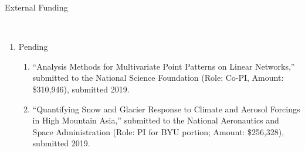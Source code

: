 \documentclass[11pt]{article}
\newcommand{\head}[1]{ %
    \bigskip %
    \begin{large}\begin{bf}{#1}\end{bf}\end{large} %

    \ \\ [-1.3cm] %

    \hrulefill}
\begin{document}
\head{External Funding}
\begin{enumerate}[label=$\bullet$]

\item Pending
\begin{enumerate}[label=$\cdot$]
\item ``Analysis Methods for Multivariate Point Patterns on Linear Networks,'' submitted to the National Science Foundation (Role: Co-PI, Amount: \$310,946), submitted 2019.
\item ``Quantifying Snow and Glacier Response to Climate and Aerosol Forcings in High Mountain Asia,'' submitted to the National Aeronautics and Space Administration (Role: PI for BYU portion; Amount: \$256,328), submitted 2019.
\end{enumerate}
\end{enumerate}
\end{document}
